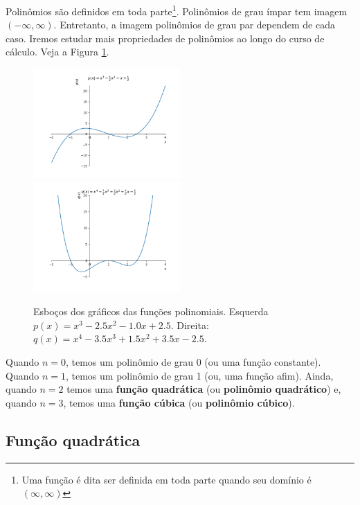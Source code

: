 Polinômios são definidos em toda parte\footnote{Uma função é dita ser definida em toda parte quando seu domínio é $(\infty, \infty)$}. Polinômios de grau ímpar tem imagem $(-\infty, \infty)$. Entretanto, a imagem polinômios de grau par dependem de cada caso. Iremos estudar mais propriedades de polinômios ao longo do curso de cálculo. Veja a Figura \ref{fig:poli_graficos}.

\begin{figure}[H]
  \centering
  \includegraphics[width=0.5\textwidth]{./cap_funcao/dados/fig_poli_graficos/fig_poli_impar}~
    \includegraphics[width=0.5\textwidth]{./cap_funcao/dados/fig_poli_graficos/fig_poli_par}
  \caption{Esboços dos gráficos das funções polinomiais. Esquerda $p(x) = x^{3} - 2.5 x^{2} - 1.0 x + 2.5$. Direita: $q(x) = x^{4} - 3.5 x^{3} + 1.5 x^{2} + 3.5 x - 2.5$.}
  \label{fig:poli_graficos}
\end{figure}

Quando $n=0$, temos um polinômio de grau 0 (ou uma função constante). Quando $n=1$, temos um polinômio de grau 1 (ou, uma função afim). Ainda, quando $n=2$ temos uma {\bf função quadrática} (ou {\bf polinômio quadrático}) e, quando $n=3$, temos uma {\bf função cúbica} (ou {\bf polinômio cúbico}).

\subsection{Função quadrática}

